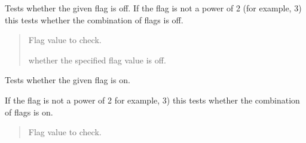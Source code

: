 \documentclass[letterpaper,10pt,english]{sphinxmanual}
\begin{document}
\begin{fulllineitems}
\begin{fulllineitems}
\begin{quote}
\begin{description}
\end{description}\end{quote}

\end{fulllineitems}


\begin{fulllineitems}
\label{\detokenize{apache_commons_validator_python.util:apache_commons_validator_python.util.flags.Flags.is_off}}
\pysigstartsignatures
{}
\pysigstopsignatures
\sphinxAtStartPar
Tests whether the given flag is off. If the flag is not a power of 2 (for
example, 3) this tests whether the combination of flags is off.
\begin{quote}\begin{description}
\sphinxAtStartPar
{} \textendash{} Flag value to check.

\sphinxAtStartPar
whether the specified flag value is off.

\end{description}\end{quote}

\end{fulllineitems}


\begin{fulllineitems}
\label{\detokenize{apache_commons_validator_python.util:apache_commons_validator_python.util.flags.Flags.is_on}}
\pysigstartsignatures
{}
\pysigstopsignatures
\sphinxAtStartPar
Tests whether the given flag is on.

\sphinxAtStartPar
If the flag is not a power of 2 for example, 3) this tests whether the
combination of flags is on.
\begin{quote}\begin{description}
\sphinxAtStartPar
{} \textendash{} Flag value to check.


\end{description}
\end{quote}
\end{fulllineitems}
\end{fulllineitems}
\end{document}
